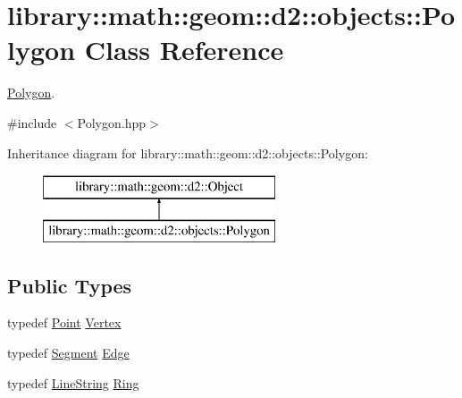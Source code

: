 \hypertarget{classlibrary_1_1math_1_1geom_1_1d2_1_1objects_1_1_polygon}{}\section{library\+:\+:math\+:\+:geom\+:\+:d2\+:\+:objects\+:\+:Polygon Class Reference}
\label{classlibrary_1_1math_1_1geom_1_1d2_1_1objects_1_1_polygon}


\hyperlink{classlibrary_1_1math_1_1geom_1_1d2_1_1objects_1_1_polygon}{Polygon}.  




{\ttfamily \#include $<$Polygon.\+hpp$>$}

Inheritance diagram for library\+:\+:math\+:\+:geom\+:\+:d2\+:\+:objects\+:\+:Polygon\+:\begin{figure}[H]
\begin{center}
\leavevmode
\includegraphics[height=2.000000cm]{classlibrary_1_1math_1_1geom_1_1d2_1_1objects_1_1_polygon}
\end{center}
\end{figure}
\subsection*{Public Types}
\begin{DoxyCompactItemize}
\item 
typedef \hyperlink{classlibrary_1_1math_1_1geom_1_1d2_1_1objects_1_1_point}{Point} \hyperlink{classlibrary_1_1math_1_1geom_1_1d2_1_1objects_1_1_polygon_a1559cddbcb23d41f2be9e389b0ccd127}{Vertex}
\item 
typedef \hyperlink{classlibrary_1_1math_1_1geom_1_1d2_1_1objects_1_1_segment}{Segment} \hyperlink{classlibrary_1_1math_1_1geom_1_1d2_1_1objects_1_1_polygon_a17e3083d71685e16f3244298e6f44ad9}{Edge}
\item 
typedef \hyperlink{classlibrary_1_1math_1_1geom_1_1d2_1_1objects_1_1_line_string}{Line\+String} \hyperlink{classlibrary_1_1math_1_1geom_1_1d2_1_1objects_1_1_polygon_aa543e7078b73e1d307ca8317d765cd9c}{Ring}
\end{DoxyCompactItemize}

